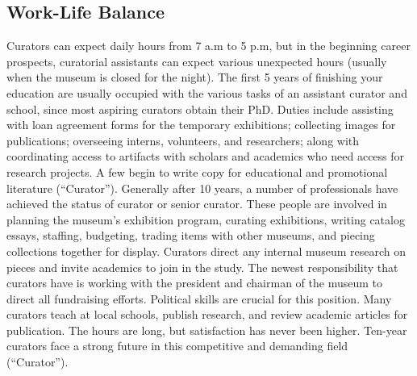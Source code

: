 \begin{multicols}{2}
\section{Work-Life Balance}
	Curators can expect daily hours from 7 a.m to 5 p.m, but in the beginning career prospects, curatorial assistants can expect various unexpected hours (usually when the museum is closed for the night). The first 5 years of finishing your education are usually occupied with the various tasks of an assistant curator and school, since most aspiring curators obtain their PhD.  Duties include assisting with loan agreement forms for the temporary exhibitions; collecting images for publications; overseeing interns, volunteers, and researchers; along with coordinating access to artifacts with scholars and academics who need access for research projects. A few begin to write copy for educational and promotional literature (“Curator”). Generally after 10 years, a number of professionals have achieved the status of curator or senior curator. These people are involved in planning the museum’s exhibition program, curating exhibitions, writing catalog essays, staffing, budgeting, trading items with other museums, and piecing collections together for display. Curators direct any internal museum research on pieces and invite academics to join in the study. The newest responsibility that curators have is working with the president and chairman of the museum to direct all fundraising efforts. Political skills are crucial for this position. Many curators teach at local schools, publish research, and review academic articles for publication. The hours are long, but satisfaction has never been higher. Ten-year curators face a strong future in this competitive and demanding field (“Curator”). 
\end{multicols}